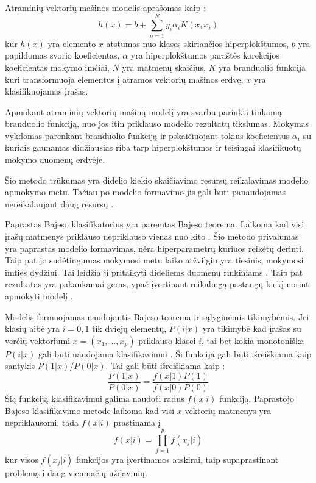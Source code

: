 Atraminių vektorių mašinos modelis aprašomas kaip \cite{comp}:
\begin{equation}
    h(x) = b + \sum_{n=1}^{N}y_i \alpha_i K(x, x_i)
\end{equation}
kur $h(x)$ yra elemento $x$ atstumas nuo klases skiriančios hiperplokštumos, $b$ yra papildomas svorio koeficientas, $\alpha$ yra hiperplokštumos paraštės korekcijos koeficientas mokymo imčiai, $N$ yra matmenų skaičius, $K$ yra branduolio funkcija kuri transformuoja elementus į atramos vektorių mašinos erdvę, $x$ yra klasifikuojamas įrašas.

Apmokant atraminių vektorių mašinų modelį yra svarbu parinkti tinkamą branduolio funkciją, nuo jos itin priklauso modelio rezultatų tikslumas. Mokymas vykdomas parenkant branduolio funkciją ir pskaičiuojant tokius koeficientus $\alpha_i$ su kuriais gaunamas didžiausias riba tarp hiperplokštumos ir teisingai klasifikuotų mokymo duomenų erdvėje.

Šio metodo trūkumas yra didelio kiekio skaičiavimo resursų reikalavimas modelio apmokymo metu. Tačiau po modelio formavimo jis gali būti panaudojamas nereikalaujant daug resursų \cite{Wu2008}.

Paprastas Bajeso klasifikatorius yra paremtas Bajeso teorema. Laikoma kad visi įrašų matmenys priklauso nepriklauso vienas nuo kito \cite{comp}. Šio metodo privalumas yra paprastas modelio formavimas, nėra hiperparametrų kuriuos reikėtų derinti. Taip pat jo sudėtingumas mokymosi metu laiko atžvilgiu yra tiesinis, mokymosi imties dydžiui. Tai leidžia jį pritaikyti dideliems duomenų rinkiniams \cite{Wu2008}. Taip pat rezultatas yra pakankamai geras, ypač įvertinant reikalingą pastangų kiekį norint apmokyti modelį \cite{Wu2008}.

  Modelis formuojamas naudojantis Bajeso teorema ir sąlyginėmis tikimybėmis. Jei klasių aibė yra $i = 0, 1$ tik dviejų elementų, $P(i|x)$ yra tikimybė kad įrašas su verčių vektoriumi $x = (x_1, ..., x_p)$ priklauso klasei $i$, tai bet kokia monotoniška $P(i|x)$ gali būti naudojama klasifikavimui \cite{Wu2008}. Ši funkcija gali būti išreiškiama kaip santykis $P(1|x)/P(0|x)$. Tai gali būti išreiškiama kaip \cite{wu2008}:
    \begin{equation}
        \frac{P(1|x)}{P(0|x)} = \frac{f(x|1)P(1)}{f(x|0)P(0)}
    \end{equation}
  Šią funkciją klasifikavimui galima naudoti radus $f(x|i)$ funkciją. Paprastojo Bajeso klasifikavimo metode laikoma kad visi $x$ vektorių matmenys yra nepriklausomi, tada $f(x|i)$ prastinama į \cite{Wu2008}
  \begin{equation}
    f(x|i) = \prod_{j=1}^{p} f(x_j|i)
  \end{equation}
  kur visos $f(x_j|i)$ funkcijos yra įvertinamos atskirai, taip supaprastinant problemą į daug  vienmačių uždavinių.


